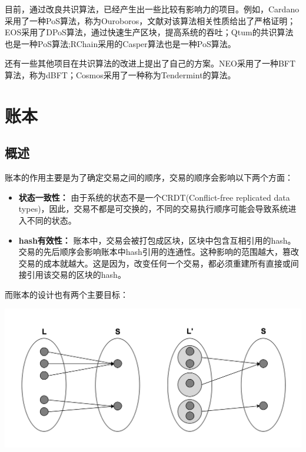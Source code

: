 \documentclass[UTF8,nofonts]{ctexart}
\begin{document}
\begin{multicols}{2}
目前，通过改良共识算法，已经产生出一些比较有影响力的项目。例如，Cardano采用了一种PoS算法，称为Ouroboros，文献\cite{bernardo2017ouroboros}对该算法相关性质给出了严格证明；EOS采用了DPoS算法，通过快速生产区块，提高系统的吞吐；Qtum\cite{dai2017smart}的共识算法也是一种PoS算法;RChain采用的Casper算法也是一种PoS算法。

还有一些其他项目在共识算法的改进上提出了自己的方案。NEO采用了一种BFT算法，称为dBFT；Cosmos采用了一种称为Tendermint\cite{tendermint}的算法。

\section{账本}
\subsection{概述}
账本的作用主要是为了确定交易之间的顺序，交易的顺序会影响以下两个方面：
\begin{itemize}
	\item \textbf{状态一致性：} 由于系统的状态不是一个CRDT(Conflict-free replicated data types)\cite{crdt}，因此，交易不都是可交换的，不同的交易执行顺序可能会导致系统进入不同的状态。
	\item \textbf{hash有效性：} 账本中，交易会被打包成区块，区块中包含互相引用的hash。交易的先后顺序会影响账本中hash引用的连通性。这种影响的范围越大，篡改交易的成本就越大。这是因为，改变任何一个交易，都必须重建所有直接或间接引用该交易的区块的hash。
\end{itemize}

而账本的设计也有两个主要目标：

\includegraphics[width=.9\linewidth]{image/ledger-merge.png}


\end{multicols}
\end{document}
